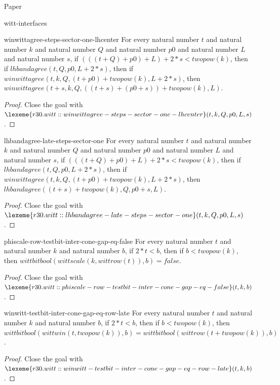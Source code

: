 \begin{lexlean}{Paper}
\begin{section}{witt-interfaces}
  \begin{theorem}{winwittagree-steps-sector-one-lhcenter}
  For every natural number \(t\) and natural number \(k\) and natural number \(Q\) and natural number \(p0\) and natural number \(L\) and natural number \(s\), if \((((t + Q) + p0) + L) + 2 * s < twopow(k)\), then if \(lhbandagree(t, Q, p0, L + 2 * s)\), then if \(winwittagree(t, k, Q, (t + p0) + twopow(k), L + 2 * s)\), then \(winwittagree(t + s, k, Q, ((t + s) + (p0 + s)) + twopow(k), L)\).
  \begin{proof}
  Close the goal with \(\lexeme{r30.witt::winwittagree-steps-sector-one-lhcenter}(t, k, Q, p0, L, s)\).
  \end{proof}
  \end{theorem}

  \begin{theorem}{lhbandagree-late-steps-sector-one}
  For every natural number \(t\) and natural number \(k\) and natural number \(Q\) and natural number \(p0\) and natural number \(L\) and natural number \(s\), if \((((t + Q) + p0) + L) + 2 * s < twopow(k)\), then if \(lhbandagree(t, Q, p0, L + 2 * s)\), then if \(winwittagree(t, k, Q, (t + p0) + twopow(k), L + 2 * s)\), then \(lhbandagree((t + s) + twopow(k), Q, p0 + s, L)\).
  \begin{proof}
  Close the goal with \(\lexeme{r30.witt::lhbandagree-late-steps-sector-one}(t, k, Q, p0, L, s)\).
  \end{proof}
  \end{theorem}

  \begin{theorem}{phiscale-row-testbit-inter-cone-gap-eq-false}
  For every natural number \(t\) and natural number \(k\) and natural number \(b\), if \(2 * t < b\), then if \(b < twopow(k)\), then \(wittbitbool(wittscale(k, wittrow(t)), b) = false\).
  \begin{proof}
  Close the goal with \(\lexeme{r30.witt::phiscale-row-testbit-inter-cone-gap-eq-false}(t, k, b)\).
  \end{proof}
  \end{theorem}

  \begin{theorem}{winwitt-testbit-inter-cone-gap-eq-row-late}
  For every natural number \(t\) and natural number \(k\) and natural number \(b\), if \(2 * t < b\), then if \(b < twopow(k)\), then \(wittbitbool(wittwin(t, twopow(k)), b) = wittbitbool(wittrow(t + twopow(k)), b)\).
  \begin{proof}
  Close the goal with \(\lexeme{r30.witt::winwitt-testbit-inter-cone-gap-eq-row-late}(t, k, b)\).
  \end{proof}
  \end{theorem}


\end{section}
\end{lexlean}
